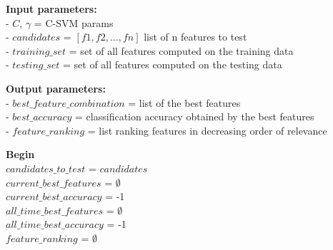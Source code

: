 \begin{algorithm}[H]
    

    
    \textbf{Input parameters:}  \\
    \hspace{0.5cm} - $C$, $\gamma$ = C-SVM params \\
    \hspace{0.5cm} - $candidates$ = $[f1,f2,...,fn]$ list of n features to test \\
    \hspace{0.5cm} - $training\_set$ = set of all features computed on the training data \\
    \hspace{0.5cm} - $testing\_set$ = set of all features computed on the testing data 
    
    \textbf{Output parameters:} \\
    \hspace{0.5cm} - $best\_feature\_combination$ = list of the best features \\
    \hspace{0.5cm} - $best\_accuracy$ = classification accuracy obtained by the best features \\
    \hspace{0.5cm} - $feature\_ranking$ = list ranking features in decreasing order of relevance
    
    \hrulefill 
    
    \textbf{Begin} \\
    $candidates\_to\_test$ = $candidates$ \\
    $current\_best\_features$ = $\emptyset$ \\
    $current\_best\_accuracy$ = -1 \\
    $all\_time\_best\_features$ = $\emptyset$ \\ 
    $all\_time\_best\_accuracy$ = -1 \\
    $feature\_ranking$ = $\emptyset$ 

\end{algorithm}
